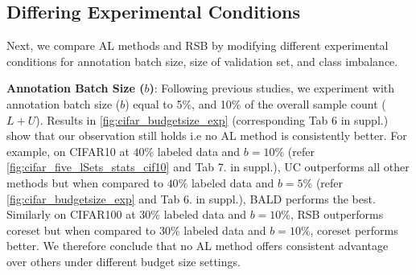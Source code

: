 \documentclass[10pt,twocolumn,letterpaper]{article}
\begin{document}
\subsection{Differing Experimental Conditions}

Next, we compare AL methods and RSB by modifying different experimental conditions for annotation batch size, size of validation set, and class imbalance.

\noindent \textbf{Annotation Batch Size ($b$)}: Following previous studies, we experiment with annotation batch size ($b$) equal to 5\%, and 10\% of the overall sample count ($L+U$). Results in \cref{fig:cifar_budgetsize_exp} (corresponding Tab 6 in suppl.) show that our observation still holds i.e no AL method is consistently better. For example, on CIFAR10 at $40\%$ labeled data and $b=10\%$ (refer \cref{fig:cifar_five_lSets_stats_cif10} and Tab 7. in suppl.), UC outperforms all other methods but when compared to $40\%$ labeled data and $b=5\%$ (refer \cref{fig:cifar_budgetsize_exp} and Tab 6. in suppl.), BALD performs the best. Similarly on CIFAR100 at $30\%$ labeled data and $b=10\%$, RSB outperforms coreset but when compared to $30\%$ labeled data and $b=10\%$, coreset performs better. We therefore conclude that no AL method offers consistent advantage over others under different budget size settings.
\end{document}
